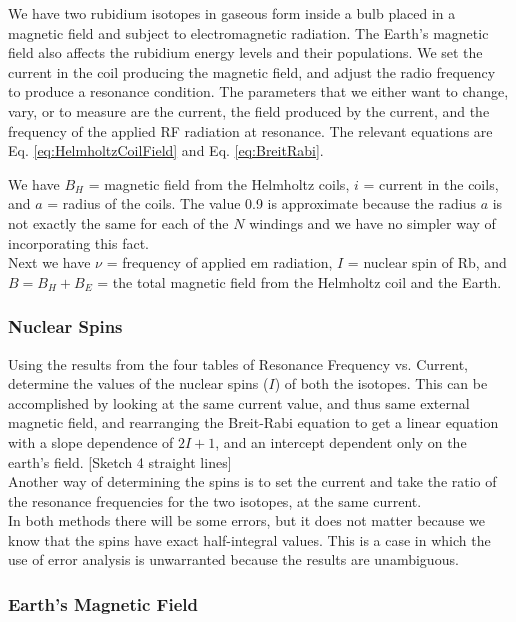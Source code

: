 \documentclass{../lab}
\begin{document}
We have two rubidium isotopes in gaseous form inside a bulb placed in a magnetic field and subject to electromagnetic radiation. The Earth's magnetic field also affects the rubidium energy levels and their populations. We set the current in the coil producing the magnetic field, and adjust the radio frequency to produce a resonance condition. The parameters that we either want to change, vary, or to measure are the current, the field produced by the current, and the frequency of the applied RF radiation at resonance. The relevant equations are Eq. \ref{eq:HelmholtzCoilField} and Eq. \ref{eq:BreitRabi}. \\

\newpage

We have $B_{H}$ = magnetic field from the Helmholtz coils, $i$ = current in the coils, and $a$ = radius of the coils. The value 0.9 is approximate because the radius $a$ is not exactly the same for each of the $N$ windings and we have no simpler way of incorporating this fact. \\

Next we have $\nu$ = frequency of applied em radiation, $I$ = nuclear spin of Rb, and $B = B_{H} + B_{E}$ = the total magnetic field from the Helmholtz coil and the Earth.

\subsubsection{Nuclear Spins}

Using the results from the four tables of Resonance Frequency vs. Current, determine the values of the nuclear spins ($I$) of both the isotopes. This can be accomplished by looking at the same current value, and thus same external magnetic field, and rearranging the Breit-Rabi equation to get a linear equation with a slope dependence of $2I + 1$, and an intercept dependent only on the earth's field. [Sketch 4 straight lines] \\

Another way of determining the spins is to set the current and take the ratio of the resonance frequencies for the two isotopes, at the same current. \\

In both methods there will be some errors, but it does not matter because we know that the spins have exact half-integral values. This is a case in which the use of error analysis is unwarranted because the results are unambiguous.

\subsubsection{Earth's Magnetic Field}
\end{document}
